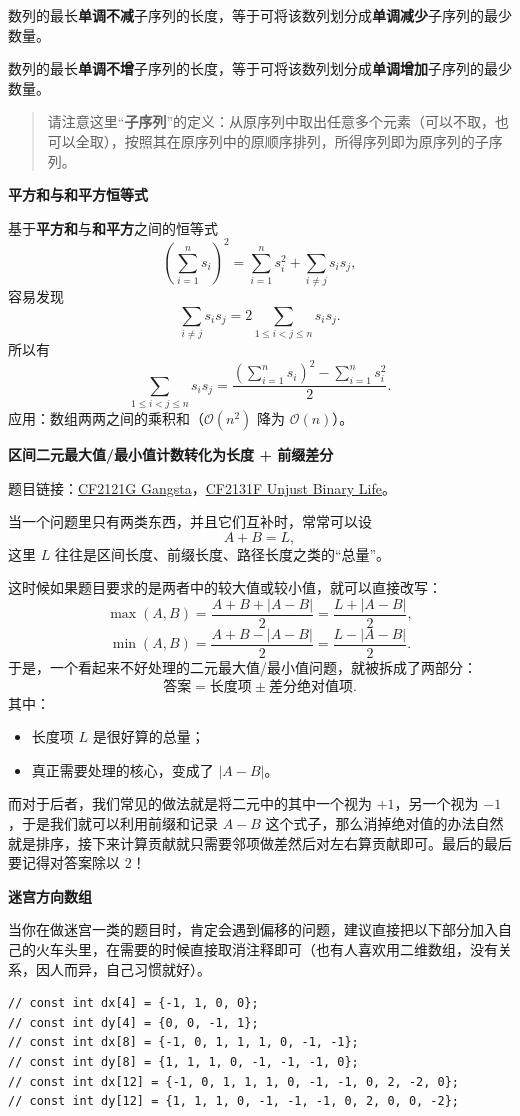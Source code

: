 数列的最长\textbf{单调不减}子序列的长度，等于可将该数列划分成\textbf{单调减少}子序列的最少数量。

数列的最长\textbf{单调不增}子序列的长度，等于可将该数列划分成\textbf{单调增加}子序列的最少数量。

\begin{quote}
请注意这里“\textbf{子序列}”的定义：从原序列中取出任意多个元素（可以不取，也可以全取），按照其在原序列中的原顺序排列，所得序列即为原序列的子序列。
\end{quote}

\par\medskip\noindent\textbf{平方和与和平方恒等式}\par\smallskip
基于\textbf{平方和}与\textbf{和平方}之间的恒等式
\[
\left(\sum_{i=1}^n s_i\right)^2=\sum_{i=1}^n s_i^2+\sum_{i\neq j}s_i s_j,
\]
容易发现
\[
\sum_{i\neq j}s_i s_j=2\sum_{1\le i<j\le n}s_i s_j.
\]
所以有
\[
\sum_{1\le i<j\le n}s_i s_j = \frac{\left(\sum_{i=1}^n s_i\right)^2 - \sum_{i=1}^n s_i^2}{2}.
\]
应用：数组两两之间的乘积和（$\mathcal{O}(n^2)$ 降为 $\mathcal{O}(n)$）。

\par\medskip\noindent\textbf{区间二元最大值/最小值计数转化为长度 + 前缀差分}\par\smallskip
题目链接：\href{https://codeforces.com/contest/2121/problem/G}{CF2121G Gangsta}，\href{https://codeforces.com/contest/2131/problem/F}{CF2131F Unjust Binary Life}。

当一个问题里只有两类东西，并且它们互补时，常常可以设
\[
A+B=L,
\]
这里 $L$ 往往是区间长度、前缀长度、路径长度之类的“总量”。

这时候如果题目要求的是两者中的较大值或较小值，就可以直接改写：
\[
\max(A,B)=\frac{A+B+|A-B|}{2}=\frac{L+|A-B|}{2},
\]
\[
\min(A,B)=\frac{A+B-|A-B|}{2}=\frac{L-|A-B|}{2}.
\]
于是，一个看起来不好处理的二元最大值/最小值问题，就被拆成了两部分：
\[
\text{答案}=\text{长度项} \pm \text{差分绝对值项}.
\]
其中：
\begin{itemize}
  \item 长度项 $L$ 是很好算的总量；
  \item 真正需要处理的核心，变成了 $|A-B|$。
\end{itemize}
而对于后者，我们常见的做法就是将二元中的其中一个视为 $+1$，另一个视为 $-1$，于是我们就可以利用前缀和记录 $A-B$ 这个式子，那么消掉绝对值的办法自然就是排序，接下来计算贡献就只需要邻项做差然后对左右算贡献即可。最后的最后要记得对答案除以 $2$！

\par\medskip\noindent\textbf{迷宫方向数组}\par\smallskip
当你在做迷宫一类的题目时，肯定会遇到偏移的问题，建议直接把以下部分加入自己的火车头里，在需要的时候直接取消注释即可（也有人喜欢用二维数组，没有关系，因人而异，自己习惯就好）。
\begin{verbatim}
// const int dx[4] = {-1, 1, 0, 0};
// const int dy[4] = {0, 0, -1, 1};
// const int dx[8] = {-1, 0, 1, 1, 1, 0, -1, -1};
// const int dy[8] = {1, 1, 1, 0, -1, -1, -1, 0};
// const int dx[12] = {-1, 0, 1, 1, 1, 0, -1, -1, 0, 2, -2, 0};
// const int dy[12] = {1, 1, 1, 0, -1, -1, -1, 0, 2, 0, 0, -2};
\end{verbatim}

